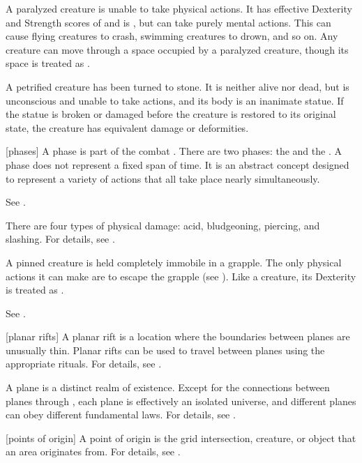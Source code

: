  A paralyzed creature is unable to take physical actions. It has effective Dexterity and Strength scores of  and is \helpless, but can take purely mental actions. This can cause flying creatures to crash, swimming creatures to drown, and so on. Any creature can move through a space occupied by a paralyzed creature, though its space is treated as .

 A petrified creature has been turned to stone. It is neither alive nor dead, but is unconscious and unable to take actions, and its body is an inanimate statue. If the statue is broken or damaged before the creature is restored to its original state, the creature has equivalent damage or deformities.

[phases] A phase is part of the combat .
There are two phases: the  and the .
A phase does not represent a fixed span of time.
It is an abstract concept designed to represent a variety of actions that all take place nearly simultaneously.

 See .

 There are four types of physical damage: acid, bludgeoning, piercing, and slashing.
For details, see .

 A pinned creature is held completely immobile in a grapple.
The only physical actions it can make are to escape the grapple (see ).
Like a  creature, its Dexterity is treated as .

 See .

[planar rifts] A planar rift is a location where the boundaries between planes are unusually thin.
Planar rifts can be used to travel between planes using the appropriate rituals.
For details, see .

 A plane is a distinct realm of existence.
Except for the connections between planes through , each plane is effectively an isolated universe, and different planes can obey different fundamental laws.
For details, see .

[points of origin] A point of origin is the grid intersection, creature, or object that an area originates from.
For details, see .

